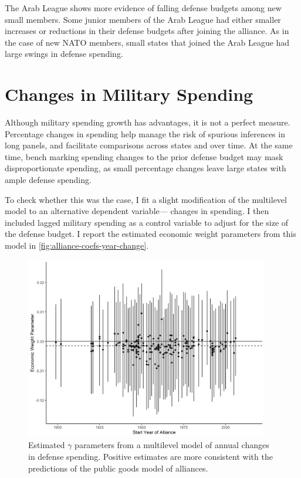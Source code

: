 \documentclass[12pt]{article}
\begin{document}
The Arab League shows more evidence of falling defense budgets among new small members. 
Some junior members of the Arab League had either smaller increases or reductions in their defense budgets after joining the alliance. 
As in the case of new NATO members, small states that joined the Arab League had large swings in defense spending. 




\section{Changes in Military Spending}


Although military spending growth has advantages, it is not a perfect measure. 
Percentage changes in spending help manage the risk of spurious inferences in long panels, and facilitate comparisons across states and over time. 
At the same time, bench marking spending changes to the prior defense budget may mask disproportionate spending, as small percentage changes leave large states with ample defense spending. 


To check whether this was the case, I fit a slight modification of the multilevel model to an alternative dependent variable--- changes in spending. 
I then included lagged military spending as a control variable to adjust for the size of the defense budget. 
I report the estimated economic weight parameters from this model in \autoref{fig:alliance-coefs-year-change}. 


\begin{figure}[htbp]
	\centering
		\includegraphics[width=0.95\textwidth]{alliance-coefs-year-change.png}
	\caption{Estimated $\gamma$ parameters from a multilevel model of annual changes in defense spending. Positive estimates are more consistent with the predictions of the public goods model of alliances.}
	\label{fig:alliance-coefs-year-change}
\end{figure}
\end{document}

